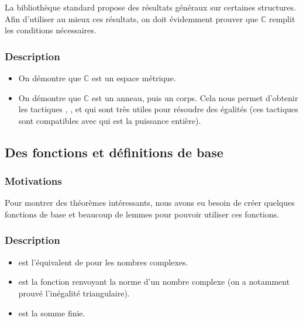 La bibliothèque standard propose des résultats généraux sur certaines structures. Afin d'utiliser au mieux ces résultats, on doit évidemment prouver que $\mathbb{C}$ remplit les conditions nécessaires.

\subsubsection{Description}

\begin{itemize}
 \item {} On démontre que $\mathbb{C}$ est un espace métrique.
 \item {} On démontre que $\mathbb{C}$ est un anneau, puis un corps. Cela nous permet d'obtenir les tactiques , ,  et  qui sont très utiles pour résoudre des égalités (ces tactiques sont compatibles avec  qui est la puissance entière).
\end{itemize}


\subsection{Des fonctions et définitions de base}

\subsubsection{Motivations}

Pour montrer des théorèmes intéressants, nous avons eu besoin de créer quelques fonctions de base et beaucoup de lemmes pour pouvoir utiliser ces fonctions. %

\subsubsection{Description}

\begin{itemize}
 \item {} est l'équivalent de  pour les nombres complexes.
 \item {} est la fonction renvoyant la norme d'un nombre complexe (on a notamment prouvé l'inégalité triangulaire).
 \item {} est la somme finie.
\end{itemize}


